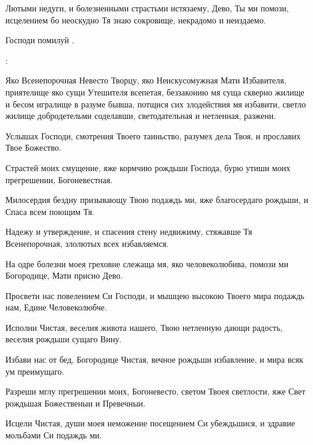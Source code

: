 \begin{mymulticols}
 Лютыми недуги, и болезненными страстьми истязаему, Дево, Ты ми помози, исцелением бо неоскудно Тя знаю сокровище, некрадомо и неиздаемо.

Господи помилуй . 

:




Яко Всенепорочная Невесто Творцу, яко Неискусомужная Мати Избавителя, приятелище яко сущи Утешителя всепетая, беззаконию мя суща скверно жилище и бесом игралище в разуме бывша, потщися сих злодействия мя избавити, светло жилище добродетельми соделавши, светодательная и нетленная, разжени.



 Услышах Господи, смотрения Твоего таиньство, разумех дела Твоя, и прославих Твое Божество.


Страстей моих смущение, яже кормчию рождьши Господа, бурю утиши моих прегрешении, Богоневестная.


Милосердия бездну призывающу Твою подаждь ми, яже благосердаго рождьши, и Спаса всем поющим Тя.

 Надежу и утверждение, и спасения стену недвижиму, стяжавше Тя Всенепорочная, злолютых всех избавляемся.

 На одре болезни моея греховне слежаща мя, яко человеколюбива, помози ми Богородице, Мати присно Дево.



 Просвети нас повелением Си Господи, и мышцею высокою Твоего мира подаждь нам, Едине Человеколюбче.


Исполни Чистая, веселия живота нашего, Твою нетленную дающи радость, веселия рождьши сущаго Вину.


Избави нас от бед, Богородице Чистая, вечное рождьши избавление, и мира всяк ум преимущаго.

 Разреши мглу прегрешении моих, Богоневесто, светом Твоея светлости, яже Свет рождьшая Божественыи и Превечныи.

 Исцели Чистая, души моея неможение посещением Си убеждьшися, и здравие мольбами Си подаждь ми.




\end{mymulticols}
